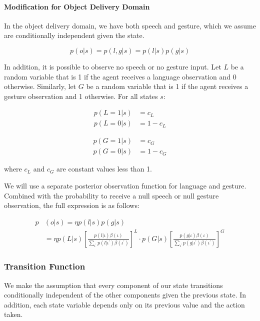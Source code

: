 \documentclass{article}
\begin{document}
\begin{multicols}{2}
\paragraph{Modification for Object Delivery Domain}


In the object delivery domain, we have both speech and gesture, which we assume are conditionally independent given the state. 

$$p(o|s) = p(l, g | s) =  p(l|s)p(g|s)$$

In addition, it is possible to observe no speech or no gesture input. Let $L$ be a random variable that is 1 if the agent receives a language observation and 0 otherwise. Similarly, let $G$ be a random variable that is 1 if the agent receives a gesture observation and 1 otherwise. For all states $s$: 

\begin{align*}
	p(L = 1 | s) &= c_L \\
	p(L = 0 | s) &= 1 - c_L 
\end{align*}

\begin{align*}
	p(G = 1 | s) &= c_G \\
	p(G = 0 | s) &= 1 - c_G 
\end{align*}

where $c_L$ and $c_G$ are constant values less than 1. 

We will use a separate posterior observation function for language and gesture. Combined with the probability to receive a null speech or null gesture observation, the full expression is as follows: 



\begin{align*}
	p&(o|s) = \eta p(l|s) p(g|s)  \\
	&= \eta p(L|s) \left[ \frac{p(l|\iota) \beta(\iota)}{\sum_{\iota^\prime} p(l|\iota^\prime)\beta(\iota^\prime)} \right] ^ L \cdot p(G|s) \left[ \frac{p(g|\iota) \beta(\iota)}{\sum_{\iota^\prime} p(g|\iota^\prime)\beta(\iota^\prime)} \right]^G
\end{align*}




\subsubsection{Transition Function} \label{sssec:tf}

We make the assumption that every component of our state transitions conditionally independent of the other components given the previous state. In addition, each state variable depends only on its previous value and the action taken. 


\end{multicols}
\end{document}

